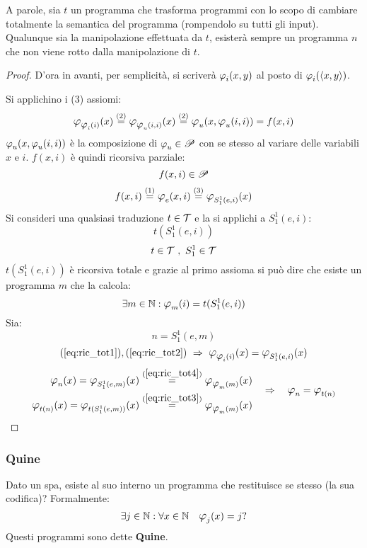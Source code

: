 A parole, sia $t$ un programma che trasforma programmi con lo scopo di cambiare
totalmente la semantica del programma (rompendolo su tutti gli input). Qualunque
sia la manipolazione effettuata da $t$, esisterà sempre un programma $n$ che non 
viene rotto dalla manipolazione di $t$.
\begin{proof} \phantom{x}

D'ora in avanti, per semplicità, si scriverà $\semRAM_i(x,y)$ al
posto di $\semRAM_i(\cantor{x,y})$.

Si applichino i (3) assiomi:
\begin{equation}\label{eq:ric_tot1}
\semRAM_{\semRAM_i(i)}(x) \overset{(2)}{=} 
\semRAM_{\semRAM_u(i,i)}(x) \overset{(2)}{=} 
\semRAM_{u}(x,\semRAM_u(i,i)) = f(x,i)
\end{equation}
$\semRAM_{u}(x,\semRAM_u(i,i))$ è la composizione di $\semRAM_u\in\ricPar$ con se
stesso al variare delle variabili $x$ e $i$. $f(x,i)$ è quindi ricorsiva parziale:
$$ f(x,i)\in\mathscr{P} $$
\begin{equation}\label{eq:ric_tot2} 
f(x,i) \overset{(1)}{=}
\semRAM_e(x,i) \overset{(3)}{=}
\semRAM_{S_1^1(e,i)}(x)
\end{equation}
Si consideri una qualsiasi traduzione $t\in\mathcal{T}$ e la si applichi a $S_1^1(e,i)$:
$$ t(S_1^1(e,i)) $$
$$ t\in\mathcal{T}\ ,\ S_1^1\in\mathcal{T} $$
$t(S_1^1(e,i))$ è ricorsiva totale e grazie al primo assioma si può dire che esiste
un programma $m$ che la calcola:
\begin{equation}\label{eq:ric_tot3}
    \exists m\in\N: \semRAM_m(i) = t(S_1^1(e,i))
\end{equation}
Sia:
$$ n = S_1^1(e,m) $$
\begin{equation}\label{eq:ric_tot4} 
    (\ref{eq:ric_tot1}),(\ref{eq:ric_tot2})\ \Rightarrow\ 
\semRAM_{\semRAM_i(i)}(x) = \semRAM_{S_1^1(e,i)}(x) \end{equation}
\vspace{.6em}
$$ \begin{aligned}
    \semRAM_n(x) = \semRAM_{S_1^1(e,m)}(x) \overset{(\ref{eq:ric_tot4})}{=}
    \semRAM_{\semRAM_m(m)}(x)\\
    \semRAM_{t(n)}(x) = \semRAM_{t(S_1^1(e,m))}(x) \overset{(\ref{eq:ric_tot3})}{=}
    \semRAM_{\semRAM_m(m)}(x)
\end{aligned}\quad \Rightarrow \quad \semRAM_n = \semRAM_{t(n)} $$
\end{proof}

\subsubsection*{Quine}
Dato un spa, esiste al suo interno un programma che restituisce se stesso (la
sua codifica)?
Formalmente:
$$ \exists j\in\N: \forall x\in\N \quad \semRAM_j(x)=j ?$$
Questi programmi sono dette \textbf{Quine}.

